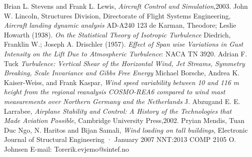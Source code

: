 \documentclass[twocolumn,showpacs,
    nofootinbib,aps,superscriptaddress,
    eqsecnum,prd,showkeys,10pt,floatfix]{revtex4}
\begin{document}
\begin{thebibliography}{20}
    Brian L.
    Stevens and Frank L.
    Lewis, \emph{Aircraft Control and Simulation},2003.
    John W.
    Lincoln, Structures Division, Directorate of Flight Systems Engineering, \emph{Aircraft landing dynamic analysis} AD-A240 123
    de Karman, Theodore; Leslie Howarth (1938).
    \emph{On the Statistical Theory of Isotropic Turbulence}
    Diedrich, Franklin W.; Joseph A.
    Drischler (1957).
    \emph{Effect of Span wise Variations in Gust Intensity on the Lift Due to Atmospheric Turbulence}: NACA TN 3920.
    Adrian F.
    Tuck \emph{Turbulence: Vertical Shear of the Horizontal Wind, Jet Streams, Symmetry Breaking, Scale Invariance and Gibbs Free Energy}
    Michael Borsche, Andrea K.
    Kaiser-Weiss, and Frank Kaspar, \emph{Wind speed variability between 10 and 116 m height from the regional reanalysis COSMO-REA6 compared to wind mast measurements over Northern Germany and the Netherlands}
    J. Abzugand E. E. Larrabee, \emph{Airplane Stability and Control: A History of the Technologies that Made Aviation Possible}, Cambridge University Press,2002.
    Pryian Mendis, Tuan Duc Ngo, N.
    Haritos and Bijan Samali, \emph{Wind loading on tall buildings}, Electronic Journal of Structural Engineering · January 2007
    NNT:2013 COMP 2105
    O. Johnsen
    E-mail: Torerik.evjemo@sintef.no
\end{thebibliography}
\end{document}
